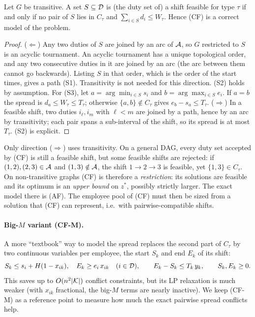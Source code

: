 \begin{proposition}\label{prop:cf}
Let $G$ be transitive. A set $S\subseteq\mathcal{D}$ is (the duty set of) a shift
feasible for type $\tau$ if and only if no pair of $S$ lies in $C_\tau$ and
$\sum_{i\in S}d_i\le W_\tau$. Hence (CF) is a correct model of the problem.
\end{proposition}
\begin{proof}
($\Leftarrow$) Any two duties of $S$ are joined by an arc of $\mathcal{A}$, so $G$
restricted to $S$ is an acyclic tournament. An acyclic tournament has a
unique topological order, and any two consecutive duties in it are joined by
an arc (the arc between them cannot go backwards). Listing $S$ in that order,
which is the order of the start times, gives a path (S1). Transitivity is not
needed for this direction. (S2) holds by assumption. For (S3), let
$a=\arg\min_{i\in S}s_i$ and $b=\arg\max_{i\in S}e_i$. If $a=b$ the spread is
$d_a\le W_\tau\le T_\tau$; otherwise $\{a,b\}\notin C_\tau$ gives
$e_b-s_a\le T_\tau$.
($\Rightarrow$) In a feasible shift, two duties $i_\ell,i_m$ with $\ell<m$ are
joined by a path, hence by an arc by transitivity; each pair spans a sub-interval
of the shift, so its spread is at most $T_\tau$. (S2) is explicit.
\end{proof}

\begin{remark}
Only direction ($\Rightarrow$) uses transitivity. On a general DAG, every
duty set accepted by (CF) is still a feasible shift, but some feasible shifts
are rejected: if $(1,2),(2,3)\in\mathcal{A}$ and $(1,3)\notin\mathcal{A}$, the shift
$1\to2\to3$ is feasible, yet $\{1,3\}\in C_\tau$. On non-transitive graphs
(CF) is therefore a \emph{restriction}: its solutions are feasible and its
optimum is an \emph{upper bound} on $z^\ast$, possibly strictly larger. The
exact model there is (AF). The employee pool of (CF) must then be sized from a
solution that (CF) can represent, i.e.\ with pairwise-compatible shifts.
\end{remark}

\paragraph{Big-$M$ variant (CF-M).}
A more ``textbook'' way to model the spread replaces the second part of
$C_\tau$ by two continuous variables per employee, the start $S_k$ and end
$E_k$ of its shift:
\begin{equation}\label{cfm}
  S_k\le s_i+H(1-x_{ik}),\quad
  E_k\ge e_i\,x_{ik}\quad(i\in\mathcal{D}),\qquad
  E_k-S_k\le T_k\,y_k,\qquad S_k,E_k\ge 0 .
\end{equation}
This saves up to $O(n^2|\mathcal{K}|)$ conflict constraints, but its LP relaxation is
much weaker (with $x_{ik}$ fractional, the big-$M$ terms are nearly
inactive). We keep (CF-M) as a reference point to measure how much the exact
pairwise spread conflicts help.

